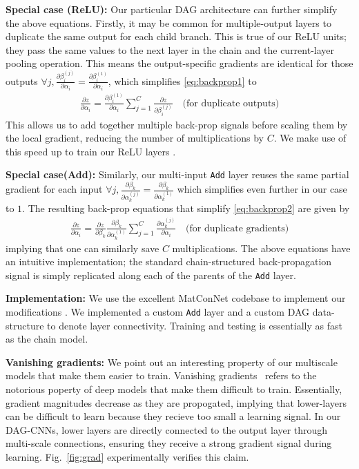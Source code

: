 \documentclass[10pt,twocolumn,letterpaper]{article}
\begin{document}
{\bf Special case (ReLU):} Our particular DAG architecture can further simplify the above equations. Firstly, it may be common for multiple-output layers to duplicate the same output for each child branch. This is true of our ReLU units; they pass the same values to the next layer in the chain and the current-layer pooling operation. This means the output-specific gradients are identical for those outputs $\forall j, \frac{\partial \beta_i^{(j)}}{\partial \alpha_i} =  \frac{\partial \beta_i^{(1)}}{\partial \alpha_i}$, which simplifies \eqref{eq:backprop1} to
\begin{align}
\frac{\partial z}{\partial \alpha_i} = \frac{\partial \beta_i^{(1)}}{\partial \alpha_i} \sum_{j=1}^{C}\frac{\partial z}{\partial \beta_i^{(j)}} \quad \text{(for duplicate outputs)}
\end{align}
This allows us to add together multiple back-prop signals before scaling them by the local gradient, reducing 
the number of multiplications by $C$. We make use of this speed up to train our ReLU layers
. 

{\bf Special case(Add):} Similarly, our multi-input {\tt Add} layer reuses the same partial gradient for each input
$\forall j, \frac{\partial \beta_k}{\partial \alpha_k^{(j)}} = \frac{\partial \beta_k}{\partial \alpha_k^{(1)}}$ which simplifies even further in our case to $1$. The resulting back-prop equations that simplify \eqref{eq:backprop2} are given by
\begin{align}
\frac{\partial z}{\partial \alpha_i} = \frac{\partial z}{\partial \beta_k} \frac{\partial \beta_k}{\partial \alpha_k^{(1)}}\sum_{j=1}^{C} \frac{\partial \alpha_k^{(j)}}{\partial \alpha_i}  \quad \text{(for duplicate gradients)}
\end{align}
\noindent implying that one can similarly save $C$ multiplications. The above equations have an intuitive implementation; the standard chain-structured back-propagation signal is simply replicated along each of the parents of the {\tt Add} layer.

{\bf Implementation:} We use the excellent MatConNet codebase to implement our modifications \cite{vedaldimatconvnet}. We implemented a custom {\tt Add} layer and a custom DAG data-structure to denote layer connectivity. Training and testing is essentially as fast as the chain model.

{\bf Vanishing gradients:} We point out an interesting property of our multiscale models that make them easier to train. Vanishing gradients~\cite{bengio1994learning} refers to the notorious poperty of deep models that make them difficult to train. Essentially, gradient magnitudes decrease as they are propogated, implying that lower-layers can be difficult to learn because they recieve too small a learning signal. In our DAG-CNNs, lower layers are directly connected to the output layer through multi-scale connections, ensuring they receive a strong gradient signal during learning. Fig.~\ref{fig:grad} experimentally verifies this claim.
\end{document}
